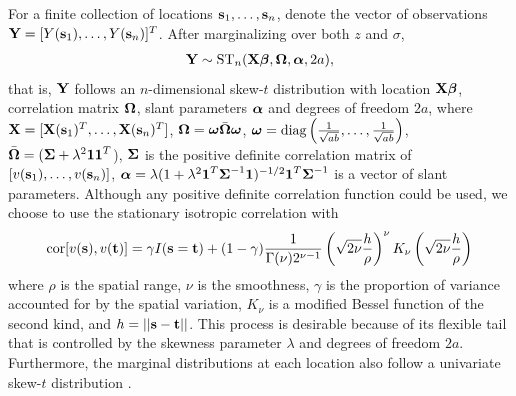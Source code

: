 \documentclass[11pt]{article}
\begin{document}
For a finite collection of locations $\mbox{\bf s}_1, \ldots, \mbox{\bf s}_n$, denote the vector of observations $\mbox{\bf Y} = [Y(\mbox{\bf s}_1), \ldots, Y(\mbox{\bf s}_n)]^T$.
After marginalizing over both $z$ and $\sigma$,
\begin{align}
  \mbox{\bf Y} \sim \text{ST}_n(\mbox{\bf X} \mbox{\boldmath $\beta$}, \mbox{\boldmath $\Omega$}, \mbox{\boldmath $\alpha$}, 2a), \label{eq:fullmodel}
\end{align}
that is, $\mbox{\bf Y}$ follows an $n$-dimensional skew-$t$ distribution with location $\mbox{\bf X} \mbox{\boldmath $\beta$}$, correlation matrix $\mbox{\boldmath $\Omega$}$, slant parameters $\mbox{\boldmath $\alpha$}$ and degrees of freedom $2a$, where $\mbox{\bf X} = [\mbox{\bf X}(\mbox{\bf s}_1)^T, \ldots, \mbox{\bf X}(\mbox{\bf s}_n)^T]$, $\mbox{\boldmath $\Omega$} = \mbox{\boldmath $\omega$} \bar{\mbox{\boldmath $\Omega$}} \mbox{\boldmath $\omega$}$, $\mbox{\boldmath $\omega$} = \text{diag}\left(\frac{1}{ \sqrt{ab}}, \ldots, \frac{1}{\sqrt{ab}}\right)$, $\bar{\mbox{\boldmath $\Omega$}} = (\mbox{\boldmath $\Sigma$} + \lambda^2 \mbox{\boldmath $1$} \mbox{\boldmath $1$}^T$), $\mbox{\boldmath $\Sigma$}$ is the positive definite correlation matrix of $[v(\mbox{\bf s}_1), \ldots, v(\mbox{\bf s}_n)]$, $\mbox{\boldmath $\alpha$} = \lambda (1 + \lambda^2 \mbox{\boldmath $1$}^T \mbox{\boldmath $\Sigma$}^{-1} \mbox{\boldmath $1$})^{-1/2} \mbox{\boldmath $1$}^T \mbox{\boldmath $\Sigma$}^{-1}$ is a vector of slant parameters.
Although any positive definite correlation function could be used, we choose to use the stationary isotropic \Matern correlation with
\begin{align}
  \text{cor}[v(\mbox{\bf s}), v(\mbox{\bf t})] = \gamma I(\mbox{\bf s} = \mbox{\bf t}) + (1 - \gamma)  \frac{ 1 }{ \Gamma(\nu) 2^{ \nu - 1}} \left( \sqrt{2\nu} \frac{ h }{ \rho } \right)^{\nu} K_{\nu} \left( \sqrt{2\nu} \frac{ h }{ \rho } \right) \label{eq:matern}
\end{align}
where $\rho$ is the spatial range, $\nu$ is the smoothness, $\gamma$ is the proportion of variance accounted for by the spatial variation, $K_\nu$ is a modified Bessel function of the second kind, and $h = || \mbox{\bf s} - \mbox{\bf t} ||$.
This process is desirable because of its flexible tail that is controlled by the skewness parameter $\lambda$ and degrees of freedom $2a$.
Furthermore, the marginal distributions at each location also follow a univariate skew-$t$ distribution \citep{Azzalini2014}.
\end{document}

